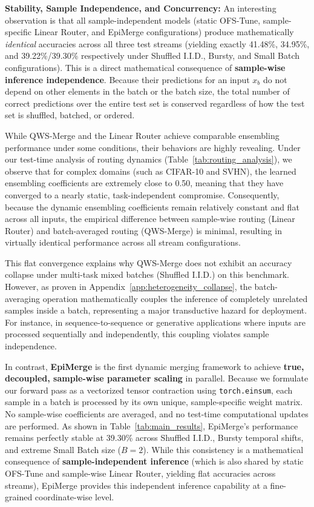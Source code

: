 \textbf{Stability, Sample Independence, and Concurrency:}
An interesting observation is that all sample-independent models (static OFS-Tune, sample-specific Linear Router, and EpiMerge configurations) produce mathematically \emph{identical} accuracies across all three test streams (yielding exactly 41.48\%, 34.95\%, and 39.22\%/39.30\% respectively under Shuffled I.I.D., Bursty, and Small Batch configurations). This is a direct mathematical consequence of \textbf{sample-wise inference independence}. Because their predictions for an input $x_b$ do not depend on other elements in the batch or the batch size, the total number of correct predictions over the entire test set is conserved regardless of how the test set is shuffled, batched, or ordered.

While QWS-Merge and the Linear Router achieve comparable ensembling performance under some conditions, their behaviors are highly revealing. Under our test-time analysis of routing dynamics (Table~\ref{tab:routing_analysis}), we observe that for complex domains (such as CIFAR-10 and SVHN), the learned ensembling coefficients are extremely close to 0.50, meaning that they have converged to a nearly static, task-independent compromise. Consequently, because the dynamic ensembling coefficients remain relatively constant and flat across all inputs, the empirical difference between sample-wise routing (Linear Router) and batch-averaged routing (QWS-Merge) is minimal, resulting in virtually identical performance across all stream configurations.

This flat convergence explains why QWS-Merge does not exhibit an accuracy collapse under multi-task mixed batches (Shuffled I.I.D.) on this benchmark. However, as proven in Appendix~\ref{app:heterogeneity_collapse}, the batch-averaging operation mathematically couples the inference of completely unrelated samples inside a batch, representing a major transductive hazard for deployment. For instance, in sequence-to-sequence or generative applications where inputs are processed sequentially and independently, this coupling violates sample independence.

In contrast, \textbf{EpiMerge} is the first dynamic merging framework to achieve \textbf{true, decoupled, sample-wise parameter scaling} in parallel. Because we formulate our forward pass as a vectorized tensor contraction using \texttt{torch.einsum}, each sample in a batch is processed by its own unique, sample-specific weight matrix. No sample-wise coefficients are averaged, and no test-time computational updates are performed. As shown in Table~\ref{tab:main_results}, EpiMerge's performance remains perfectly stable at 39.30\% across Shuffled I.I.D., Bursty temporal shifts, and extreme Small Batch size ($B=2$). While this consistency is a mathematical consequence of \textbf{sample-independent inference} (which is also shared by static OFS-Tune and sample-wise Linear Router, yielding flat accuracies across streams), EpiMerge provides this independent inference capability at a fine-grained coordinate-wise level.

